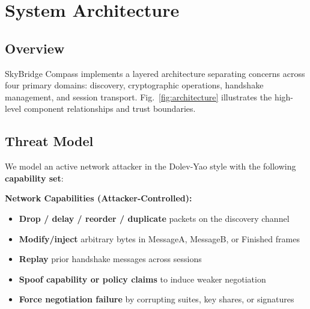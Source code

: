 \documentclass[10pt,journal,compsoc]{IEEEtran}
\providecommand{\tightlist}{%
  \setlength{\itemsep}{0pt}\setlength{\parskip}{0pt}}
\begin{document}
\section{System Architecture}\label{sec:system-architecture}

\subsection{Overview}\label{a.-overview}

SkyBridge Compass implements a layered architecture separating concerns
across four primary domains: discovery, cryptographic operations,
handshake management, and session transport. Fig.~\ref{fig:architecture} illustrates the
high-level component relationships and trust boundaries.

\subsection{Threat Model}\label{a.1-threat-model}

We model an active network attacker in the Dolev-Yao style with the
following \textbf{capability set}:

\textbf{Network Capabilities (Attacker-Controlled):}
\begin{itemize}\tightlist
\item
  \textbf{Drop / delay / reorder / duplicate} packets on the discovery
  channel
\item
  \textbf{Modify/inject} arbitrary bytes in MessageA, MessageB, or
  Finished frames
\item
  \textbf{Replay} prior handshake messages across sessions
\item
  \textbf{Spoof capability or policy claims} to induce weaker
  negotiation
\item
  \textbf{Force negotiation failure} by corrupting suites, key shares,
  or signatures
\end{itemize}
\end{document}
